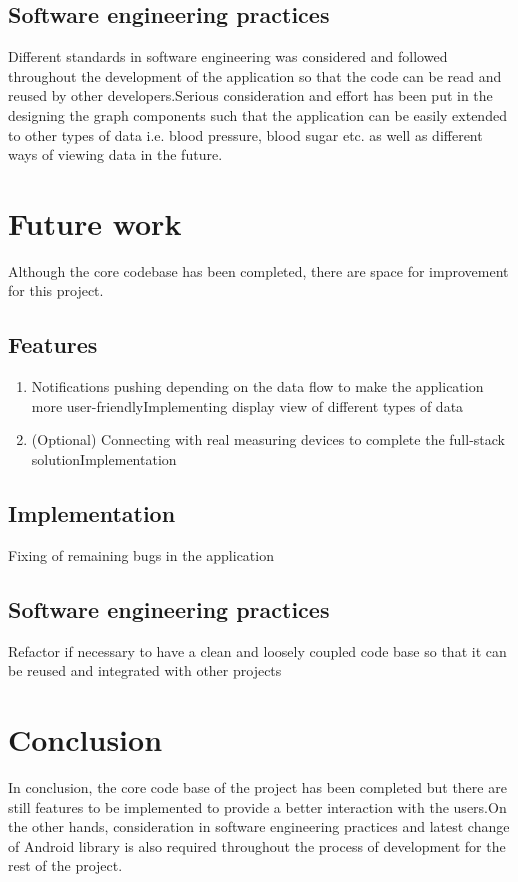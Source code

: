 \subsection{Software engineering practices}

Different standards in software engineering was considered and followed throughout the development of the application so that the code can be read and reused by other developers.Serious consideration and effort has been put in the designing the graph components such that the application can be easily extended to other types of data i.e. blood pressure, blood sugar etc. as well as different ways of viewing data in the future.

\section{Future work}
\label{sec:Work done so far}

Although the core codebase has been completed, there are space for improvement for this project.
\subsection{Features}

\begin{enumerate}
\item Notifications pushing depending on the data flow to make the application more user-friendlyImplementing display view of different types of data\item (Optional) Connecting with real measuring devices to complete the full-stack solutionImplementation
\end{enumerate}

\subsection{Implementation}

Fixing of remaining bugs in the application

\subsection{Software engineering practices}
Refactor if necessary to have a clean and loosely coupled code base so that it can be reused and integrated with other projects

\section{Conclusion}
In conclusion, the core code base of the project has been completed but there are still features to be implemented to provide a better interaction with the users.On the other hands, consideration in software engineering practices and latest change of Android library is also required throughout the process of development for the rest of the project.

